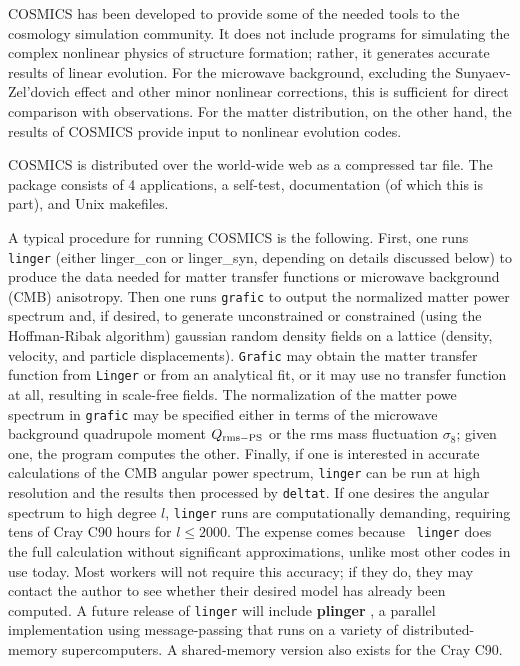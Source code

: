 COSMICS has been developed to provide some of the needed tools to the
cosmology simulation community.  It does not include programs for
simulating the complex nonlinear physics of structure formation; rather,
it generates accurate results of linear evolution.  For the microwave
background, excluding the Sunyaev-Zel'dovich effect and other minor
nonlinear corrections, this is sufficient for direct comparison with
observations.  For the matter distribution, on the other hand, the results
of COSMICS provide input to nonlinear evolution codes.

COSMICS is distributed over the world-wide web as a compressed tar file.
The package consists of 4 applications, a self-test, documentation (of
which this is part), and Unix makefiles.

A typical procedure for running COSMICS is the following.  First, one
runs {\tt linger} (either linger\_con or linger\_syn, depending on
details discussed below) to produce the data needed for matter transfer
functions or microwave background (CMB) anisotropy. Then one runs
{\tt grafic} to output the normalized matter power spectrum and, if desired,
to generate unconstrained or constrained (using the Hoffman-Ribak
algorithm) gaussian random density fields on a lattice (density, velocity,
and particle displacements).  {\tt Grafic} may obtain the matter transfer
function from {\tt Linger} or from an analytical fit, or it may use no
transfer function at all, resulting in scale-free fields.  The normalization
of the matter powe spectrum in {\tt grafic} may be specified either in
terms of the microwave background quadrupole moment $Q_{\rm rms-PS}$ or the
rms mass fluctuation $\sigma_8$; given one, the program computes the other.
Finally, if one is interested in accurate calculations of the CMB angular
power spectrum, {\tt linger} can be run at high resolution and the results
then processed by {\tt deltat}.  If one desires the angular spectrum to
high degree $l$, {\tt linger} runs are computationally demanding, requiring
tens of Cray C90 hours for $l\le2000$.  The expense comes because {\tt
linger} does the full calculation without significant approximations,
unlike most other codes in use today.  Most workers will not require this
accuracy; if they do, they may contact the author to see whether their
desired model has already been computed.  A future release of {\tt linger}
will include {\bf plinger} \cite{bodesc95,bodeaas186}, a parallel
implementation using message-passing that runs on a variety of
distributed-memory supercomputers.  A shared-memory version also exists
for the Cray C90.

